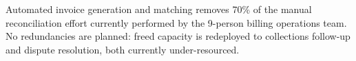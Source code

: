 \begin{tcolorbox}[infobox, title={\faUsers\ Where the FTE saving comes from}]
Automated invoice generation and matching removes 70\% of the manual reconciliation effort
currently performed by the 9-person billing operations team. No redundancies are planned:
freed capacity is redeployed to collections follow-up and dispute resolution, both currently
under-resourced.
\end{tcolorbox}
